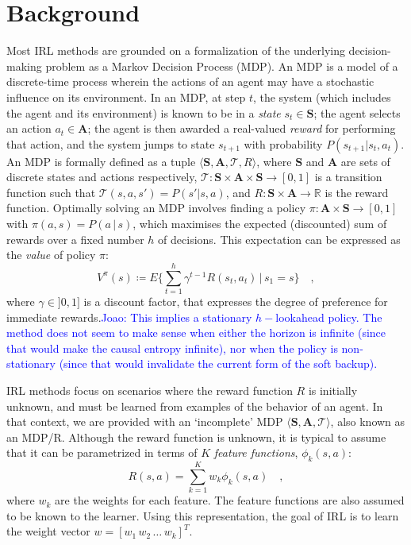 \documentclass[letterpaper]{article}
\newcommand{\jm}[1]{\textcolor{blue}{Joao: #1}}
\newcommand{\jm}[1]{}
\begin{document}
\section{Background}
Most IRL methods are grounded on a formalization of the underlying decision-making problem as a Markov Decision Process (MDP). An MDP is a model of a discrete-time process wherein the actions of an agent may have a stochastic influence on its environment. In an MDP, at step $t$, the system (which includes the agent and its environment) is known to be in a \emph{state} $s_t\in\mathbf{S}$; the agent selects an action $a_t\in\mathbf{A}$; the agent is then awarded a real-valued \emph{reward} for performing that action, and the system jumps to state $s_{t+1}$ with probability $P(s_{t+1}|s_t,a_t)$. An MDP is formally defined as a tuple $\langle\mathbf{S},\mathbf{A},\mathcal{T},R\rangle$, where $\mathbf{S}$ and $\mathbf{A}$ are sets of discrete states and actions respectively, $\mathcal{T}:\mathbf{S}\times\mathbf{A}\times\mathbf{S}\rightarrow [0,1]$ is a transition function such that $\mathcal T(s,a,s')=P(s'|s,a)$, and $R:\mathbf{S}\times\mathbf{A}\rightarrow\mathbb R$ is the reward function. 
Optimally solving an MDP involves finding a policy $\pi:\mathbf{A}\times\mathbf{S}\rightarrow[0,1]$ with $\pi(a,s) = P(a\,|\,s)$, which maximises the expected (discounted) sum of rewards over a fixed number $h$ of decisions. This expectation can be expressed as the \emph{value} of policy $\pi$:
\begin{equation}
\label{eq:value}
 V^\pi(s) \coloneqq E\{\sum_{t = 1}^h \gamma^{t-1}R(s_t,a_t)\,\vert\, s_1 = s\} \quad,
\end{equation}
where $\gamma\in]0,1]$ is a discount factor, that expresses the degree of preference for immediate rewards.\jm{This implies a stationary $h-$lookahead policy. The method does not seem to make sense when either the horizon is infinite (since that would make the causal entropy infinite), nor when the policy is non-stationary (since that would invalidate the current form of the soft backup).}

IRL methods focus on scenarios where the reward function $R$ is initially unknown, and must be learned from examples of the behavior of an agent. In that context, we are provided with an `incomplete' MDP $\langle\mathbf{S},\mathbf{A},\mathcal{T}\rangle$, also known as an MDP/R. Although the reward function is unknown, it is typical to assume that it can be parametrized in terms of $K$ \emph{feature functions}, $\phi_k(s,a)$:
\begin{equation}
R(s,a) = \sum_{k=1}^Kw_k\phi_k(s,a)\quad, \label{eq:rew}
\end{equation}
where $w_k$ are the weights for each feature. The feature functions are also assumed to be known to the learner. Using this representation, the goal of IRL is to learn the weight vector $w=[w_1\,w_2\,\ldots\,w_k]^T$.
\end{document}
